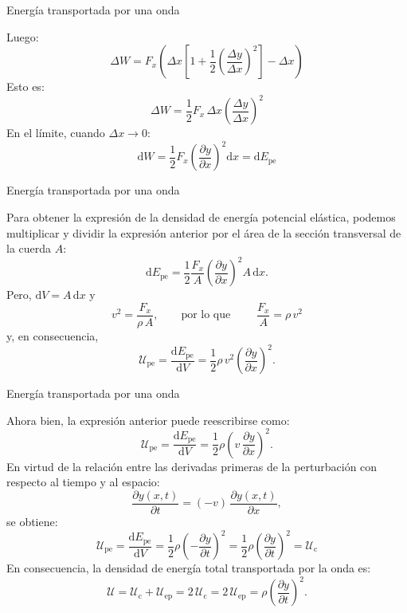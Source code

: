 \documentclass[11pt,handout,aspectratio=1610]{beamer}
\newcommand{\diff}[0]{\text{d}}
\newcommand{\fdiff}[2]{\dfrac{\text{d} #1}{\text{d} #2}}
\newcommand{\pdiff}[2]{\frac{\partial #1}{\partial #2}}
\begin{document}
\begin{frame}{Energía transportada por una onda}

    Luego: $$ \Delta W = F_x \left(\Delta x \left[1 + \frac{1}{2} \left(\frac{\Delta y}{\Delta x}\right)^2\right] - \Delta x\right) $$ Esto es: $$ \Delta W = \frac{1}{2} F_x \, \Delta x \left(\frac{\Delta y}{\Delta x}\right)^2 $$ En el límite, cuando $\Delta x \to 0 $: $$ \diff W = \frac{1}{2} F_x \left(\pdiff{y}{x}\right)^2 \diff x = \diff E_\text{pe} $$

\end{frame}

\begin{frame}{Energía transportada por una onda}

    Para obtener la expresión de la densidad de energía potencial elástica, podemos multiplicar y dividir la expresión anterior por el área de la sección transversal de la cuerda $A$: $$ \diff E_\text{pe} = \frac{1}{2} \frac{F_x}{A} \left(\pdiff{y}{x}\right)^2 A \, \diff x. $$ Pero, $\diff V = A \, \diff x$ y $$ v^2 = \frac{F_x}{\rho \, A}, \qquad \text{por lo que } \qquad \frac{F_x}{A} = \rho \, v^2 $$ y, en consecuencia, $$ \mathcal{U}_\text{pe} = \fdiff{E_\text{pe}}{V} = \frac{1}{2} \rho \, v^2 \left(\pdiff{y}{x}\right)^2. $$

\end{frame}

\begin{frame}{Energía transportada por una onda}

    Ahora bien, la expresión anterior puede reescribirse como: $$ \mathcal{U}_\text{pe} = \fdiff{E_\text{pe}}{V} = \frac{1}{2} \rho \left( v \, \pdiff{y}{x}\right)^2. $$ En virtud de la relación entre las derivadas primeras de la perturbación con respecto al tiempo y al espacio: $$ \pdiff{y(x,t)}{t} = \left(-v\right) \, \pdiff{y(x,t)}{x}, $$ se obtiene: $$ \mathcal{U}_\text{pe} = \fdiff{E_\text{pe}}{V} = \frac{1}{2} \rho \left( - \pdiff{y}{t}\right)^2 = \frac{1}{2} \rho \left(\pdiff{y}{t}\right)^2 = \mathcal{U}_\text{c} $$ En consecuencia, la densidad de energía total transportada por la onda es: $$ \mathcal{U} = \mathcal{U}_\text{c} + \mathcal{U}_\text{ep} = 2 \, \mathcal{U}_\text{c} = 2 \, \mathcal{U}_\text{ep} = \rho \left(\pdiff{y}{t}\right)^2. $$

\end{frame}
\end{document}
